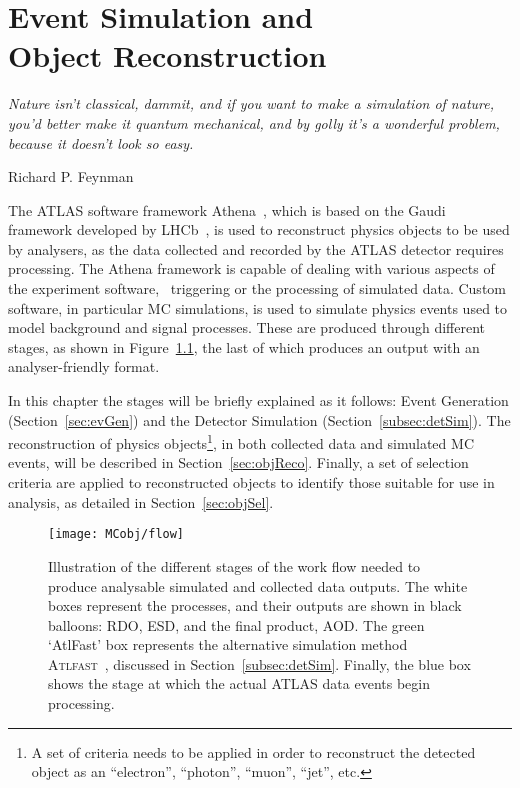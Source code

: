 \chapter[Event Simulation and Object Reconstruction]{Event Simulation and \protect\\Object Reconstruction}
\label{ch:evSimObjReco}
\epigraph{\emph{Nature isn't classical, dammit, and if you want to make a simulation of nature, you'd better make it quantum mechanical, and by golly it's a wonderful problem, because it doesn't look so easy.}} {Richard P. Feynman}

	The \ac{ATLAS} software framework Athena~\cite{TDR2005}, which is based on the Gaudi~\cite{Gaudi2000} framework developed by \ac{LHCb}~\cite{LHCb2008}, is used to reconstruct physics objects to be used by analysers, as the data collected and recorded by the \ac{ATLAS} detector requires processing. The Athena framework is capable of dealing with various aspects of the experiment software, \eg\ triggering or the processing of simulated data. Custom software, in particular \ac{MC} simulations, is used to simulate physics events used to model background and signal processes. These are produced through different stages, as shown in Figure~\ref{fig:workflow}, the last of which produces an output with an analyser-friendly format. 

	In this chapter the stages will be briefly explained as it follows: Event Generation (Section~\ref{sec:evGen}) and the Detector Simulation (Section~\ref{subsec:detSim}). The reconstruction of physics objects\footnote{A set of criteria needs to be applied in order to reconstruct the detected object as an ``electron'', ``photon'', ``muon'', ``jet'', etc.}, in both collected data and simulated \ac{MC} events, will be described in Section~\ref{sec:objReco}. Finally, a set of selection criteria are applied to reconstructed objects to identify those suitable for use in analysis, as detailed in Section~\ref{sec:objSel}.

	\begin{figure}
		\centering
		\texttt{[image: MCobj/flow]}
		\caption{\label{fig:workflow} Illustration of the different stages of the work flow needed to produce analysable simulated and collected data outputs. The white boxes represent the processes, and their outputs are shown in black balloons: \ac{RDO}, \ac{ESD}, and the final product, \ac{AOD}. The green `AtlFast' box represents the alternative simulation method \textsc{Atlfast}~\cite{Lukas2012}, discussed in Section~\ref{subsec:detSim}. Finally, the blue box shows the stage at which the actual \ac{ATLAS} data events begin processing.}
	\end{figure}



